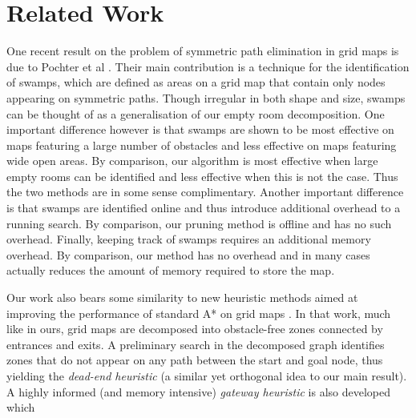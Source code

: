 \section{Related Work}
One recent result on the problem of symmetric path elimination in grid maps is due to
Pochter et al \cite{pochter09}.
Their main contribution is a technique for the identification of swamps, which are defined as
areas on a grid map that contain only nodes appearing on symmetric paths.
Though irregular in both shape and size, swamps can be thought of as a generalisation of our
empty room decomposition.
One important difference however is that swamps are shown to be most effective on maps featuring a
large number of obstacles and less effective on maps featuring wide open areas.
By comparison, our algorithm is most effective when large empty rooms can be identified and less
effective when this is not the case.
Thus the two methods are in some sense complimentary.
Another important difference is that swamps are identified online and thus introduce additional 
overhead to a running search.
By comparison, our pruning method is offline and has no such overhead.
Finally, keeping track of swamps requires an additional memory overhead.
By comparison, our method has no overhead and in many cases actually reduces the amount of
memory required to store the map.
\par
Our work also bears some similarity to new heuristic methods aimed at improving the 
performance of standard A* on grid maps \cite{bjornsson06}.
In that work, much like in ours, grid maps are decomposed into obstacle-free zones connected by entrances 
and exits. 
A preliminary search in the decomposed graph identifies zones that do not appear 
on any path between the start and goal node, thus yielding the \emph{dead-end heuristic} 
(a similar yet orthogonal idea to our main result).
A highly informed (and memory intensive) \emph{gateway heuristic} is also developed which 
